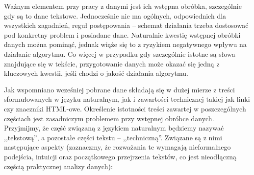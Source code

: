\documentclass{praca1}
\begin{document}
Ważnym elementem przy pracy z danymi jest ich wstępna obróbka, szczególnie gdy są to dane tekstowe. Jednocześnie nie ma ogólnych, odpowiednich dla wszystkich zagadnień, reguł postępowania -- schemat działania trzeba dostosować pod konkretny problem i posiadane dane. Naturalnie kwestię wstępnej obróbki danych można pominąć, jednak wiąże się to z ryzykiem negatywnego wpływu na działanie algorytmu. Co więcej w przypadku gdy szczególnie istotne są słowa znajdujące się w tekście, przygotowanie danych może okazać się jedną z kluczowych kwestii, jeśli chodzi o jakość działania algorytmu.

Jak wspomniano wcześniej pobrane dane składają się w dużej mierze z treści sformułowanych w języku naturalnym, jak i zawartości technicznej takiej jak linki czy znaczniki HTML-owe. Określenie istotności treści zawartej w poszczególnych częściach jest zasadniczym problemem przy wstępnej obróbce danych. Przyjmijmy, że część związaną z językiem naturalnym będziemy nazywać ,,tekstową'', a pozostałe części tekstu -- ,,techniczną''. Związane są z nimi następujące aspekty (zaznaczmy, że rozważania te wymagają nieformalnego podejścia, intuicji oraz początkowego przejrzenia tekstów, co jest nieodłączną częścią praktycznej analizy danych):
\end{document}
